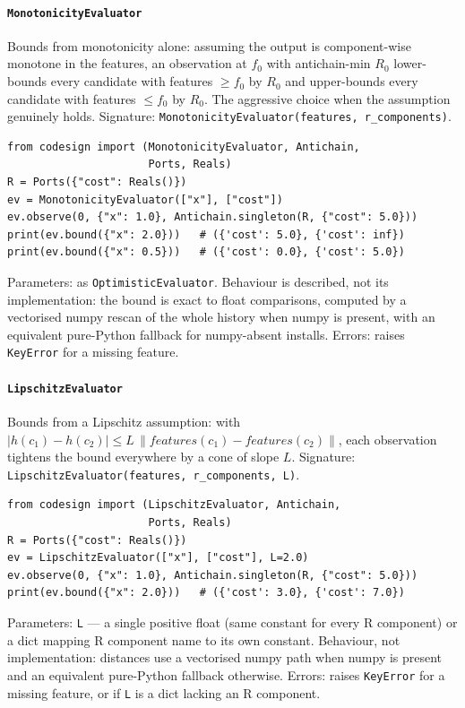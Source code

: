 \documentclass[11pt,a4paper]{article}
\begin{document}
\paragraph{\texttt{MonotonicityEvaluator}}\label{ref:online:monotonicityevaluator}
Bounds from monotonicity alone: assuming the output is component-wise
monotone in the features, an observation at $f_0$ with antichain-min $R_0$
lower-bounds every candidate with features $\geq f_0$ by $R_0$ and
upper-bounds every candidate with features $\leq f_0$ by $R_0$. The
aggressive choice when the assumption genuinely holds.
Signature: \texttt{MonotonicityEvaluator(features, r\_components)}.
\begin{lstlisting}
from codesign import (MonotonicityEvaluator, Antichain,
                      Ports, Reals)
R = Ports({"cost": Reals()})
ev = MonotonicityEvaluator(["x"], ["cost"])
ev.observe(0, {"x": 1.0}, Antichain.singleton(R, {"cost": 5.0}))
print(ev.bound({"x": 2.0}))   # ({'cost': 5.0}, {'cost': inf})
print(ev.bound({"x": 0.5}))   # ({'cost': 0.0}, {'cost': 5.0})
\end{lstlisting}
Parameters: as \texttt{OptimisticEvaluator}. Behaviour is described, not
its implementation: the bound is exact to float comparisons, computed by a
vectorised numpy rescan of the whole history when numpy is present, with an
equivalent pure-Python fallback for numpy-absent installs. Errors: raises
\texttt{KeyError} for a missing feature.

\paragraph{\texttt{LipschitzEvaluator}}\label{ref:online:lipschitzevaluator}
Bounds from a Lipschitz assumption: with
$|h(c_1)-h(c_2)| \leq L\,\|features(c_1)-features(c_2)\|$, each observation
tightens the bound everywhere by a cone of slope $L$.
Signature: \texttt{LipschitzEvaluator(features, r\_components, L)}.
\begin{lstlisting}
from codesign import (LipschitzEvaluator, Antichain,
                      Ports, Reals)
R = Ports({"cost": Reals()})
ev = LipschitzEvaluator(["x"], ["cost"], L=2.0)
ev.observe(0, {"x": 1.0}, Antichain.singleton(R, {"cost": 5.0}))
print(ev.bound({"x": 2.0}))   # ({'cost': 3.0}, {'cost': 7.0})
\end{lstlisting}
Parameters: \texttt{L} --- a single positive float (same constant for every
R component) or a dict mapping R component name to its own constant.
Behaviour, not implementation: distances use a vectorised numpy path when
numpy is present and an equivalent pure-Python fallback otherwise. Errors:
raises \texttt{KeyError} for a missing feature, or if \texttt{L} is a dict
lacking an R component.
\end{document}
